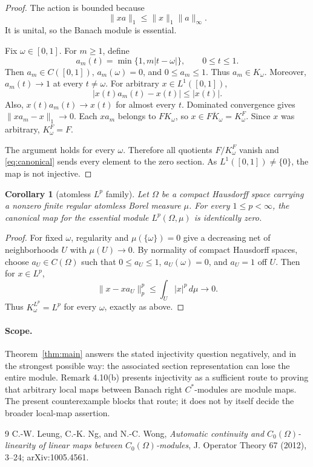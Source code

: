 \documentclass[11pt]{article}
\newtheorem{corollary}[theorem]{Corollary}
\newcommand{\Om}{\Omega}
\begin{document}
\begin{proof}
The action is bounded because
\[
                       \|xa\|_1\le \|x\|_1\|a\|_\infty.
\]
It is unital, so the Banach module is essential.

Fix $\omega\in[0,1]$.  For $m\ge1$, define
\[
                 a_m(t)=\min\{1,m|t-\omega|\},
                 \qquad 0\le t\le1.
\]
Then $a_m\in C([0,1])$, $a_m(\omega)=0$, and $0\le a_m\le1$.  Thus
$a_m\in K_\omega$.  Moreover, $a_m(t)\to1$ at every
$t\ne\omega$.  For arbitrary $x\in L^1([0,1])$,
\[
 |x(t)a_m(t)-x(t)|\le |x(t)|.
\]
Also, $x(t)a_m(t)\longrightarrow x(t)$ for almost every $t$.
Dominated convergence gives $\|xa_m-x\|_1\to0$.  Each $xa_m$ belongs to
$F K_\omega$, so $x\in\overline{F K_\omega}=K_\omega^F$.  Since $x$ was
arbitrary, $K_\omega^F=F$.

The argument holds for every $\omega$.  Therefore all quotients
$F/K_\omega^F$ vanish and \eqref{eq:canonical} sends every element to the
zero section.  As $L^1([0,1])\ne\{0\}$, the map is not injective.
\end{proof}

\begin{corollary}[atomless $L^p$ family]\label{cor:lp}
Let $\Om$ be a compact Hausdorff space carrying a nonzero finite regular
atomless Borel measure $\mu$.  For every $1\le p<\infty$, the canonical map
for the essential module $L^p(\Om,\mu)$ is identically zero.
\end{corollary}

\begin{proof}
For fixed $\omega$, regularity and $\mu(\{\omega\})=0$ give a decreasing net
of neighborhoods $U$ with $\mu(U)\to0$.  By normality of compact Hausdorff
spaces, choose $a_U\in C(\Om)$ such that $0\le a_U\le1$,
$a_U(\omega)=0$, and $a_U=1$ off $U$.  Then for $x\in L^p$,
\[
 \|x-xa_U\|_p^p\le\int_U |x|^p\,d\mu\longrightarrow0.
\]
Thus $K_\omega^{L^p}=L^p$ for every $\omega$, exactly as above.
\end{proof}
\paragraph{Scope.}
Theorem~\ref{thm:main} answers the stated injectivity question negatively,
and in the strongest possible way: the associated section representation can
lose the entire module.  Remark 4.10(b) presents injectivity as a sufficient
route to proving that arbitrary local maps between Banach right
$C^*$-modules are module maps.  The present counterexample blocks that route;
it does not by itself decide the broader local-map assertion.

{\small
\begin{thebibliography}{9}
C.-W. Leung, C.-K. Ng, and N.-C. Wong,
\emph{Automatic continuity and $C_0(\Omega)$-linearity of linear maps between
$C_0(\Omega)$-modules}, J. Operator Theory 67 (2012), 3--24;
arXiv:1005.4561.
\end{thebibliography}
}
\end{document}
